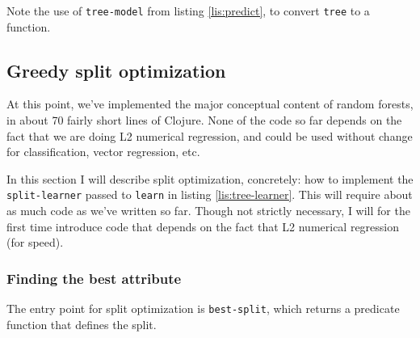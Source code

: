 \documentclass[11pt,openany,american,usenames,dvipsnames,svgnames,x11names,table,isodate]{article}
\numberwithin{equation}{section}
\numberwithin{figure}{section}
\begin{document}
Note the use of \texttt{tree-model} from listing \ref{lis:predict},
to convert \texttt{tree} to a function.

\subsection{\label{sub:Split-optimization}Greedy split optimization}

At this point, we've implemented the major conceptual content of random
forests, in about 70 fairly short lines of Clojure. None of the code
so far depends on the fact that we are doing L2 numerical regression,
and could be used without change for classification, vector regression,
etc.

In this section I will describe split optimization, concretely: how
to implement the \texttt{split-learner} passed to \texttt{learn} in
listing \ref{lis:tree-learner}. This will require about as much code
as we've written so far. Though not strictly necessary, I will for
the first time introduce code that depends on the fact that L2 numerical
regression (for speed).


\subsubsection{Finding the best attribute}

The entry point for split optimization is \texttt{best-split}, which
returns a predicate function that defines the split.
\end{document}
